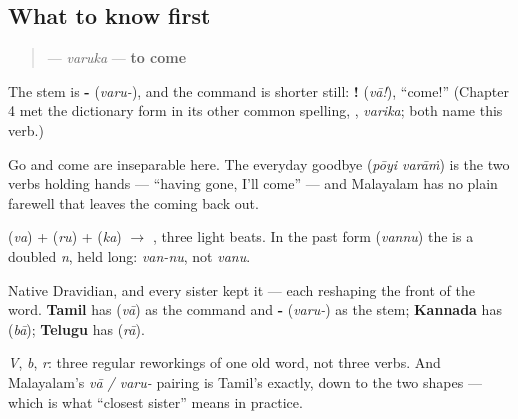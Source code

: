 \subsection*{What to know first}
\begin{quote}
\textbf{} — \emph{varuka} — \textbf{to come}
\end{quote}

The stem is \textbf{-} (\emph{varu-}), and the command is shorter still: \textbf{!} (\emph{vā!}), \textquotedblleft{}come!\textquotedblright{} (Chapter 4 met the dictionary form in its other common spelling, \textbf{}, \emph{varika}; both name this verb.)

Go and come are inseparable here. The everyday goodbye \textbf{ } (\emph{pōyi varāṁ}) is the two verbs holding hands — \textquotedblleft{}having gone, I'll come\textquotedblright{} — and Malayalam has no plain farewell that leaves the coming back out.

\begin{sounds}
\textbf{} (\emph{va}) + \textbf{} (\emph{ru}) + \textbf{} (\emph{ka}) $\to$ \textbf{}, three light beats. In the past form \textbf{} (\emph{vannu}) the \textbf{} is a doubled \emph{n}, held long: \emph{van-nu}, not \emph{vanu}.
\end{sounds}

\begin{cousinweb}
Native Dravidian, and every sister kept it — each reshaping the front of the word. \textbf{Tamil} has \textbf{} (\emph{vā}) as the command and \textbf{-} (\emph{varu-}) as the stem; \textbf{Kannada} has \textbf{} (\emph{bā}); \textbf{Telugu} has \textbf{} (\emph{rā}).

\emph{V}, \emph{b}, \emph{r}: three regular reworkings of one old word, not three verbs. And Malayalam's \emph{vā / varu-} pairing is Tamil's exactly, down to the two shapes — which is what \textquotedblleft{}closest sister\textquotedblright{} means in practice.
\end{cousinweb}

